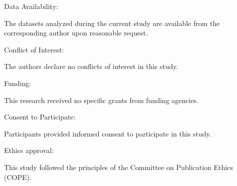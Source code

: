 \documentclass[10pt]{NSP1}
\begin{document}
Data Availability:

The datasets analyzed during the current study are available from the corresponding author upon reasonable request.

Conflict of Interest:

The authors declare no conflicts of interest in this study.

Funding:

This research received no specific grants from funding agencies.

Consent to Participate:

Participants provided informed consent to participate in this study.

Ethics approval:

This study followed the principles of the Committee on Publication Ethics (COPE).
\end{document}
